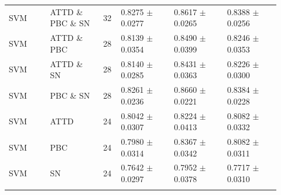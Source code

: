 \documentclass[10pt,a4paper]{article}
\renewcommand{\arraystretch}{1.10}
\newcommand{\classifiersep}{\addlinespace[1pt]\midrule\addlinespace[1pt]}
\begin{document}
\begin{landscape}
\begin{longtable}{@{}L{0.14\linewidth}L{0.18\linewidth}C{0.06\linewidth}C{0.18\linewidth}C{0.18\linewidth}C{0.18\linewidth}@{}}
\classifiersep
SVM & ATTD \& PBC \& SN & 32 & 0.8275 $\pm$ 0.0277 & 0.8617 $\pm$ 0.0265 & 0.8388 $\pm$ 0.0256 \\
SVM & ATTD \& PBC & 28 & 0.8139 $\pm$ 0.0354 & 0.8490 $\pm$ 0.0399 & 0.8246 $\pm$ 0.0353 \\
SVM & ATTD \& SN & 28 & 0.8140 $\pm$ 0.0285 & 0.8431 $\pm$ 0.0363 & 0.8226 $\pm$ 0.0300 \\
SVM & PBC \& SN & 28 & 0.8261 $\pm$ 0.0236 & 0.8660 $\pm$ 0.0221 & 0.8384 $\pm$ 0.0228 \\
SVM & ATTD & 24 & 0.8042 $\pm$ 0.0307 & 0.8224 $\pm$ 0.0413 & 0.8082 $\pm$ 0.0332 \\
SVM & PBC & 24 & 0.7980 $\pm$ 0.0314 & 0.8367 $\pm$ 0.0342 & 0.8082 $\pm$ 0.0311 \\
SVM & SN & 24 & 0.7642 $\pm$ 0.0297 & 0.7952 $\pm$ 0.0378 & 0.7717 $\pm$ 0.0310 \\
\classifiersep
\end{longtable}
\end{landscape}
\normalsize
\renewcommand{\arraystretch}{1.10}
\end{document}
